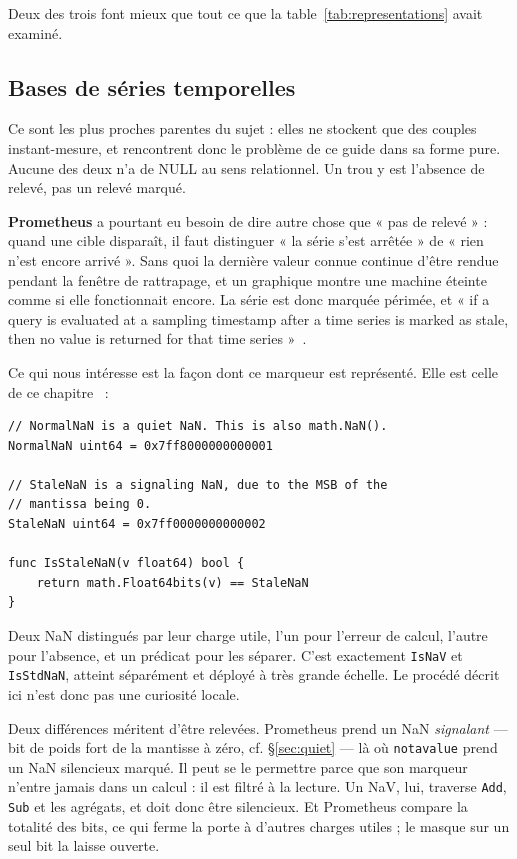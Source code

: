\documentclass[11pt,a4paper]{report}
\begin{document}
Deux des trois font mieux que tout ce que la table~\ref{tab:representations}
avait examiné.

\subsection{Bases de séries temporelles}\label{sec:tsdb}

Ce sont les plus proches parentes du sujet : elles ne stockent que des
couples instant-mesure, et rencontrent donc le problème de ce guide dans
sa forme pure. Aucune des deux n'a de NULL au sens relationnel. Un trou
y est l'absence de relevé, pas un relevé marqué.

\textbf{Prometheus} a pourtant eu besoin de dire autre chose que « pas
de relevé » : quand une cible disparaît, il faut distinguer « la série
s'est arrêtée » de « rien n'est encore arrivé ». Sans quoi la dernière
valeur connue continue d'être rendue pendant la fenêtre de rattrapage,
et un graphique montre une machine éteinte comme si elle fonctionnait
encore. La série est donc marquée périmée, et « if a query is evaluated
at a sampling timestamp after a time series is marked as stale, then no
value is returned for that time series »~\cite{promstaleness}.

Ce qui nous intéresse est la façon dont ce marqueur est représenté. Elle
est celle de ce chapitre~\cite{promvalue} :

\begin{verbatim}
// NormalNaN is a quiet NaN. This is also math.NaN().
NormalNaN uint64 = 0x7ff8000000000001

// StaleNaN is a signaling NaN, due to the MSB of the
// mantissa being 0.
StaleNaN uint64 = 0x7ff0000000000002

func IsStaleNaN(v float64) bool {
    return math.Float64bits(v) == StaleNaN
}
\end{verbatim}

Deux NaN distingués par leur charge utile, l'un pour l'erreur de calcul,
l'autre pour l'absence, et un prédicat pour les séparer. C'est
exactement \texttt{IsNaV} et \texttt{IsStdNaN}, atteint séparément et
déployé à très grande échelle. Le procédé décrit ici n'est donc pas une
curiosité locale.

Deux différences méritent d'être relevées. Prometheus prend un NaN
\emph{signalant} --- bit de poids fort de la mantisse à zéro, cf.
§\ref{sec:quiet} --- là où \texttt{notavalue} prend un NaN silencieux
marqué. Il peut se le permettre parce que son marqueur n'entre jamais
dans un calcul : il est filtré à la lecture. Un NaV, lui, traverse
\texttt{Add}, \texttt{Sub} et les agrégats, et doit donc être silencieux.
Et Prometheus compare la totalité des bits, ce qui ferme la porte à
d'autres charges utiles ; le masque sur un seul bit la laisse ouverte.
\end{document}
